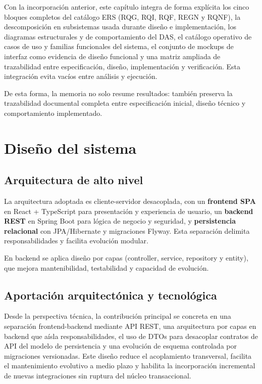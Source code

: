 Con la incorporaci\'on anterior, este cap\'itulo integra de forma expl\'icita los cinco bloques completos del cat\'alogo ERS (RQG, RQI, RQF, REGN y RQNF), la descomposici\'on en subsistemas usada durante dise\~no e implementaci\'on, los diagramas estructurales y de comportamiento del DAS, el cat\'alogo operativo de casos de uso y familias funcionales del sistema, el conjunto de mockups de interfaz como evidencia de dise\~no funcional y una matriz ampliada de trazabilidad entre especificaci\'on, dise\~no, implementaci\'on y verificaci\'on. Esta integraci\'on evita vac\'ios entre an\'alisis y ejecuci\'on.

De esta forma, la memoria no solo resume resultados: tambi\'en preserva la
trazabilidad documental completa entre especificaci\'on inicial, dise\~no t\'ecnico
y comportamiento implementado.

\FloatBarrier
\section{Dise\~no del sistema}

\subsection{Arquitectura de alto nivel}

La arquitectura adoptada es cliente-servidor desacoplada, con un \textbf{frontend SPA} en React + TypeScript para presentaci\'on y experiencia de usuario, un \textbf{backend REST} en Spring Boot para l\'ogica de negocio y seguridad, y \textbf{persistencia relacional} con JPA/Hibernate y migraciones Flyway. Esta separaci\'on delimita responsabilidades y facilita evoluci\'on modular.

En backend se aplica dise\~no por capas
(controller, service, repository y entity),
que mejora mantenibilidad, testabilidad y capacidad de evoluci\'on.

\subsection{Aportaci\'on arquitect\'onica y tecnol\'ogica}

Desde la perspectiva t\'ecnica, la contribuci\'on principal se concreta en una separaci\'on frontend-backend mediante API REST, una arquitectura por capas en backend que a\'isla responsabilidades, el uso de DTOs para desacoplar contratos de API del modelo de persistencia y una evoluci\'on de esquema controlada por migraciones versionadas. Este dise\~no reduce el acoplamiento transversal, facilita el mantenimiento evolutivo a medio plazo y habilita la incorporaci\'on incremental de nuevas integraciones sin ruptura del n\'ucleo transaccional.


